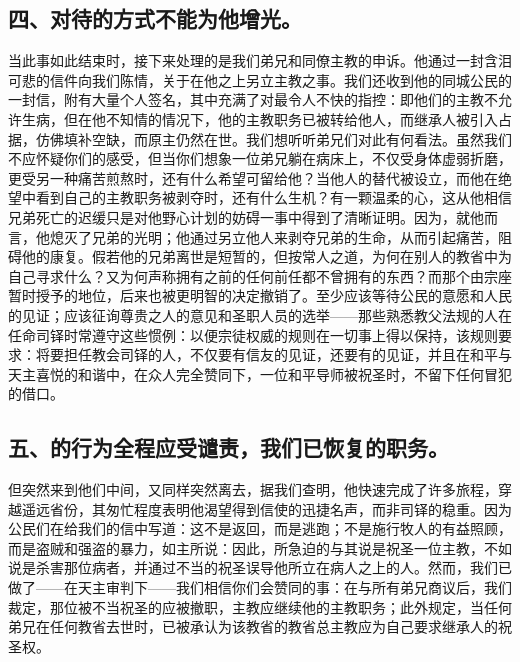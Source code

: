 
\subsection{四、对待的方式不能为他增光。}

当此事如此结束时，接下来处理的是我们弟兄和同僚主教的申诉。他通过一封含泪可悲的信件向我们陈情，关于在他之上另立主教之事。我们还收到他的同城公民的一封信，附有大量个人签名，其中充满了对最令人不快的指控：即他们的主教不允许生病，但在他不知情的情况下，他的主教职务已被转给他人，而继承人被引入占据，仿佛填补空缺，而原主仍然在世。我们想听听弟兄们对此有何看法。虽然我们不应怀疑你们的感受，但当你们想象一位弟兄躺在病床上，不仅受身体虚弱折磨，更受另一种痛苦煎熬时，还有什么希望可留给他？当他人的替代被设立，而他在绝望中看到自己的主教职务被剥夺时，还有什么生机？有一颗温柔的心，这从他相信兄弟死亡的迟缓只是对他野心计划的妨碍一事中得到了清晰证明。因为，就他而言，他熄灭了兄弟的光明；他通过另立他人来剥夺兄弟的生命，从而引起痛苦，阻碍他的康复。假若他的兄弟离世是短暂的，但按常人之道，为何在别人的教省中为自己寻求什么？又为何声称拥有之前的任何前任都不曾拥有的东西？而那个由宗座暂时授予的地位，后来也被更明智的决定撤销了。至少应该等待公民的意愿和人民的见证；应该征询尊贵之人的意见和圣职人员的选举——那些熟悉教父法规的人在任命司铎时常遵守这些惯例：以便宗徒权威的规则在一切事上得以保持，该规则要求：将要担任教会司铎的人，不仅要有信友的见证，还要有的见证，并且在和平与天主喜悦的和谐中，在众人完全赞同下，一位和平导师被祝圣时，不留下任何冒犯的借口。\par


\subsection{五、的行为全程应受谴责，我们已恢复的职务。}

但突然来到他们中间，又同样突然离去，据我们查明，他快速完成了许多旅程，穿越遥远省份，其匆忙程度表明他渴望得到信使的迅捷名声，而非司铎的稳重。因为公民们在给我们的信中写道：这不是返回，而是逃跑；不是施行牧人的有益照顾，而是盗贼和强盗的暴力，如主所说：因此，所急迫的与其说是祝圣一位主教，不如说是杀害那位病者，并通过不当的祝圣误导他所立在病人之上的人。然而，我们已做了——在天主审判下——我们相信你们会赞同的事：在与所有弟兄商议后，我们裁定，那位被不当祝圣的应被撤职，主教应继续他的主教职务；此外规定，当任何弟兄在任何教省去世时，已被承认为该教省的教省总主教应为自己要求继承人的祝圣权。\par


